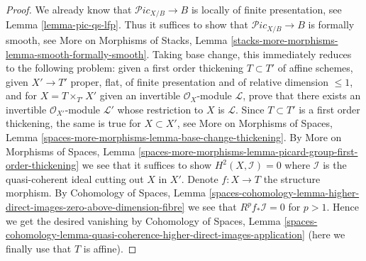 \documentclass[10pt,a4paper]{amsart}
\theoremstyle{plain}
\theoremstyle{definition}
\theoremstyle{remark}
\numberwithin{equation}{subsection}
\def\Picardstack{\mathcal{P}\!\mathit{ic}}
\begin{document}
\begin{proof}
We already know that $\Picardstack_{X/B} \to B$ is
locally of finite presentation, see Lemma \ref{lemma-pic-qs-lfp}.
Thus it suffices to show that $\Picardstack_{X/B} \to B$ is
formally smooth, see More on Morphisms of Stacks, Lemma
\ref{stacks-more-morphisms-lemma-smooth-formally-smooth}.
Taking base change, this immediately reduces to the following
problem: given a first order thickening $T \subset T'$
of affine schemes, given $X' \to T'$ proper, flat, of finite
presentation and of relative dimension $\leq 1$, and
for $X = T \times_{T'} X'$ given an invertible $\mathcal{O}_X$-module
$\mathcal{L}$, prove that there exists an invertible
$\mathcal{O}_{X'}$-module $\mathcal{L}'$ whose
restriction to $X$ is $\mathcal{L}$.
Since $T \subset T'$ is a first order thickening, the
same is true for $X \subset X'$, see
More on Morphisms of Spaces, Lemma
\ref{spaces-more-morphisms-lemma-base-change-thickening}.
By More on Morphisms of Spaces, Lemma
\ref{spaces-more-morphisms-lemma-picard-group-first-order-thickening}
we see that it suffices to show $H^2(X, \mathcal{I}) = 0$
where $\mathcal{I}$ is the quasi-coherent ideal cutting out $X$ in $X'$.
Denote $f : X \to T$ the structure morphism.
By Cohomology of Spaces, Lemma
\ref{spaces-cohomology-lemma-higher-direct-images-zero-above-dimension-fibre}
we see that $R^pf_*\mathcal{I} = 0$ for $p > 1$.
Hence we get the desired vanishing by
Cohomology of Spaces, Lemma
\ref{spaces-cohomology-lemma-quasi-coherence-higher-direct-images-application}
(here we finally use that $T$ is affine).
\end{proof}
\end{document}
